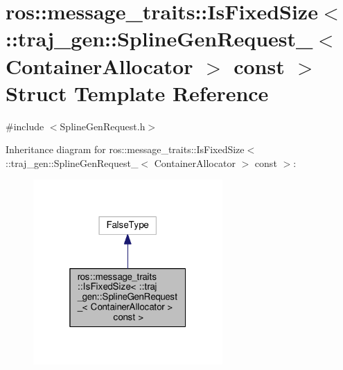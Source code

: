 \hypertarget{structros_1_1message__traits_1_1_is_fixed_size_3_01_1_1traj__gen_1_1_spline_gen_request___3_01_c1ecde96b449db99fe3c628d37e48a8e1}{}\section{ros\+:\+:message\+\_\+traits\+:\+:Is\+Fixed\+Size$<$ \+:\+:traj\+\_\+gen\+:\+:Spline\+Gen\+Request\+\_\+$<$ Container\+Allocator $>$ const $>$ Struct Template Reference}
\label{structros_1_1message__traits_1_1_is_fixed_size_3_01_1_1traj__gen_1_1_spline_gen_request___3_01_c1ecde96b449db99fe3c628d37e48a8e1}


{\ttfamily \#include $<$Spline\+Gen\+Request.\+h$>$}



Inheritance diagram for ros\+:\+:message\+\_\+traits\+:\+:Is\+Fixed\+Size$<$ \+:\+:traj\+\_\+gen\+:\+:Spline\+Gen\+Request\+\_\+$<$ Container\+Allocator $>$ const $>$\+:
\nopagebreak
\begin{figure}[H]
\begin{center}
\leavevmode
\includegraphics[width=205pt]{structros_1_1message__traits_1_1_is_fixed_size_3_01_1_1traj__gen_1_1_spline_gen_request___3_01_cd32f4725f181f55e36c235be2ba6f31a}
\end{center}
\end{figure}


